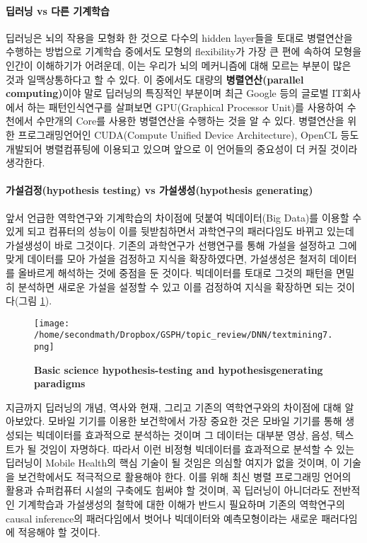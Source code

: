 \documentclass[10pt]{article}
\begin{document}
\paragraph{딥러닝 vs 다른 기계학습}
딥러닝은 뇌의 작용을 모형화 한 것으로 다수의 hidden layer들을 토대로 병렬연산을 수행하는 방법으로 기계학습 중에서도 모형의 flexibility가 가장 큰 편에 속하여 모형을 인간이 이해하기가 어려운데, 이는 우리가 뇌의 메커니즘에 대해 모르는 부분이 많은 것과 일맥상통하다고 할 수 있다. 이 중에서도 대량의 \textbf{병렬연산(parallel computing)}이야 말로 딥러닝의 특징적인 부분이며 최근 Google 등의 글로벌 IT회사에서 하는 패턴인식연구를 살펴보면 GPU(Graphical Processor Unit)를 사용하여 수천에서 수만개의 Core를 사용한 병렬연산을 수행하는 것을 알 수 있다\cite{le2013building,coates2013deep}. 병렬연산을 위한 프로그래밍언어인 CUDA(Compute Unified Device Architecture), OpenCL 등도 개발되어 병렬컴퓨팅에 이용되고 있으며 앞으로 이 언어들의 중요성이 더 커질 것이라 생각한다\cite{nvidia2007compute,stone2010opencl}.

\paragraph{가설검정(hypothesis testing) vs 가설생성(hypothesis generating)}
앞서 언급한 역학연구와 기계학습의 차이점에 덧붙여 빅데이터(Big Data)를 이용할 수 있게 되고 컴퓨터의 성능이 이를 뒷받침하면서 과학연구의 패러다임도 바뀌고 있는데 가설생성이 바로 그것이다\cite{biesecker2013hypothesis}. 기존의 과학연구가 선행연구를 통해 가설을 설정하고 그에 맞게 데이터를 모아 가설을 검정하고 지식을 확장하였다면, 가설생성은 철저히 데이터를 올바르게 해석하는 것에 중점을 둔 것이다. 빅데이터를 토대로 그것의 패턴을 면밀히 분석하면 새로운 가설을 설정할 수 있고 이를 검정하여 지식을 확장하면 되는 것이다(그림 \ref{hypogenerate}). 

\begin{figure}[!ht]
\centering
\texttt{[image: /home/secondmath/Dropbox/GSPH/topic\_review/DNN/textmining7.png]}
\caption{\bf{Basic science hypothesis-testing and hypothesisgenerating
paradigms \cite{biesecker2013hypothesis}}}
\label{hypogenerate}
\end{figure}


지금까지 딥러닝의 개념, 역사와 현재, 그리고 기존의 역학연구와의 차이점에 대해 알아보았다. 모바일 기기를 이용한 보건학에서 가장 중요한 것은 모바일 기기를 통해 생성되는 빅데이터를 효과적으로 분석하는 것이며 그 데이터는 대부분 영상, 음성, 텍스트가 될 것임이 자명하다. 따라서 이런 비정형 빅데이터를 효과적으로 분석할 수 있는 딥러닝이 Mobile Health의 핵심 기술이 될 것임은 의심할 여지가 없을 것이며, 이 기술을 보건학에서도 적극적으로 활용해야 한다. 이를 위해 최신 병렬 프로그래밍 언어의 활용과 슈퍼컴퓨터 시설의 구축에도 힘써야 할 것이며, 꼭 딥러닝이 아니더라도 전반적인 기계학습과 가설생성의 철학에 대한 이해가 반드시 필요하며 기존의 역학연구의 causal inference의 패러다임에서 벗어나 빅데이터와 예측모형이라는 새로운 패러다임에 적응해야 할 것이다. 




\end{document}
